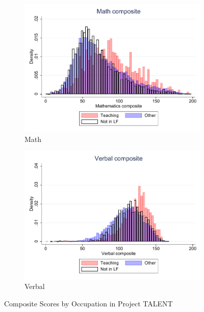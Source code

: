 \documentclass[onehalfspacing,11pt]{article}
\begin{document}
	\begin{figure}
		\begin{subfigure}{0.49\textwidth}
			\includegraphics[width=\linewidth]{TALENT_math_occ.pdf}
			\caption{Math} \label{fig:talentmath}
		\end{subfigure}
		\hspace*{\fill} %
		\begin{subfigure}{0.49\textwidth}
			\includegraphics[width=\linewidth]{TALENT_verb_occ.pdf}
			\caption{Verbal} \label{fig:talentverb}
		\end{subfigure}
		\caption{Composite Scores by Occupation in Project TALENT} \label{fig:talent}
	\end{figure}
	
\end{document}
